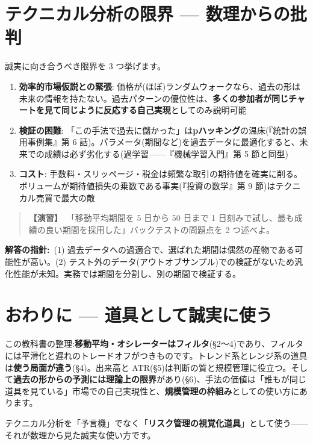 \documentclass{article}
\begin{document}
\section{テクニカル分析の限界 — 数理からの批判}

誠実に向き合うべき限界を 3 つ挙げます。

\begin{enumerate}
\item \textbf{効率的市場仮説との緊張}: 価格が(ほぼ)ランダムウォークなら、過去の形は未来の情報を持たない。過去パターンの優位性は、\textbf{多くの参加者が同じチャートを見て同じように反応する自己実現}としてのみ説明可能
\item \textbf{検証の困難}: 「この手法で過去に儲かった」は\textbf{pハッキング}の温床(『統計の誤用事例集』第 6 話)。パラメータ(期間など)を過去データに最適化すると、未来での成績は必ず劣化する(過学習——『機械学習入門』第 5 節と同型)
\item \textbf{コスト}: 手数料・スリッページ・税金は頻繁な取引の期待値を確実に削る。ボリュームが期待値損失の乗数である事実(『投資の数学』第 9 節)はテクニカル売買で最大の敵
\end{enumerate}

\begin{quote}
\textbf{【演習】}\ 「移動平均期間を 5 日から 50 日まで 1 日刻みで試し、最も成績の良い期間を採用した」バックテストの問題点を 2 つ述べよ。
\end{quote}

\textbf{解答の指針:}\ (1) 過去データへの過適合で、選ばれた期間は偶然の産物である可能性が高い。(2) テスト外のデータ(アウトオブサンプル)での検証がないため汎化性能が未知。実務では期間を分割し、別の期間で検証する。

\section{おわりに — 道具として誠実に使う}

この教科書の整理:\textbf{移動平均・オシレーターはフィルタ}(§2〜4)であり、フィルタには平滑化と遅れのトレードオフがつきものです。トレンド系とレンジ系の道具は\textbf{使う局面が違う}(§4)。出来高と ATR(§5)は判断の質と規模管理に役立つ。そして\textbf{過去の形からの予測には理論上の限界}があり(§6)、手法の価値は「誰もが同じ道具を見ている」市場での自己実現性と、\textbf{規模管理の枠組み}としての使い方にあります。

テクニカル分析を「予言機」でなく「\textbf{リスク管理の視覚化道具}」として使う——それが数理から見た誠実な使い方です。
\end{document}
